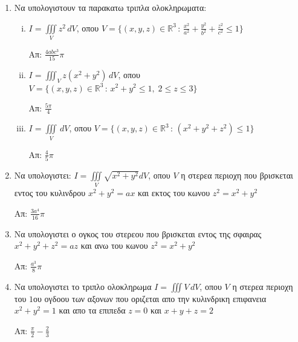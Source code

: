 


\thispagestyle{empty}
\everymath{\displaystyle}



\begin{center}
\end{center}

\vspace{\baselineskip}

\begin{enumerate}

\item Να υπολογιστουν τα παρακατω τριπλα ολοκληρωματα:

\begin{enumerate}[i)]

\item $I=\iiint\limits_{V}z^2\,dV$, οπου $V=\{(x,y,z)\in \mathbb{R}^3\,:\, \frac{x^2}{a^2}+\frac{y^2}{b^2}+\frac{z^2}{c^2}\leq 1\}$

\hfill Απ: $\frac{4abc^3}{15}\pi$

\item $I=\iiint_{V}z(x^2+y^2)\,dV$, οπου $V=\{(x,y,z)\in\mathbb{R}^3\,:\, x^2+y^2\leq 1,\; 2\leq z\leq 3\}$

\hfill Απ: $\frac{5\pi}{4}$

\item $I=\iiint\limits_{V}\,dV$, οπου $V=\{(x,y,z)\in \mathbb{R}^3\,:\, (x^2+y^2+z^2)\leq 1\}$ 

\hfill Απ: $\frac{4}{5}\pi$


\end{enumerate}

\item Να υπολογιστει: $I=\iiint\limits_{V}\sqrt{x^2+y^2}dV$, οπου $V$ η στερεα περιοχη που βρισκεται εντος του κυλινδρου $x^2+y^2=ax$ και εκτος του κωνου $z^2=x^2+y^2$

\hfill Απ: $\frac{3a^4}{16}\pi$

\item Να υπολογιστει ο ογκος του στερεου που βρισκεται εντος της σφαιρας $x^2+y^2+z^2=az$ και ανω του κωνου $z^2=x^2+y^2$ 

\hfill Απ: $\frac{a^3}{8}\pi$

\item Nα υπολογιστει το τριπλο ολοκληρωμα $I=\iiint\limits{V}\,dV$, οπου $V$ η στερεα περιοχη του $1$ου ογδοου των αξονων που οριζεται απο την κυλινδρικη επιφανεια $x^2+y^2=1$ και απο τα επιπεδα $z=0$ και $x+y+z=2$

\hfill Απ: $\frac{\pi}{2}-\frac{2}{3}$

\end{enumerate}






